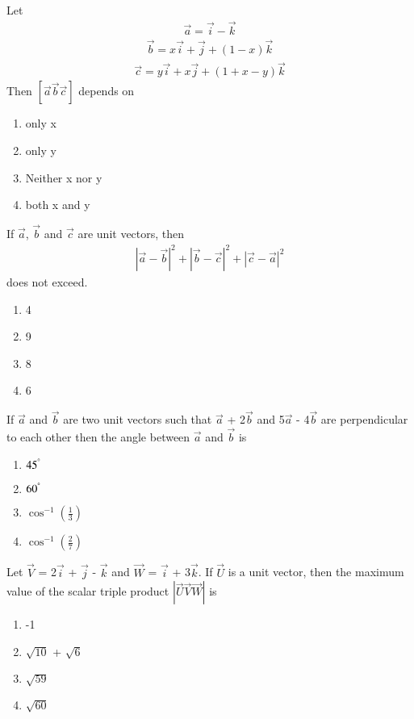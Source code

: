 \item Let 
\begin{align*}
\overrightarrow{a} = \overrightarrow{i} - \overrightarrow{k}
\end{align*}
\begin{align*}
\overrightarrow{b} = x\overrightarrow{i} + \overrightarrow{j} + (1 - x)\overrightarrow{k}
\end{align*}
\begin{align*}
\overrightarrow{c} = y\overrightarrow{i} + x\overrightarrow{j} + (1 + x -y)\overrightarrow{k}
\end{align*}
Then $[\overrightarrow{a}\overrightarrow{b}\overrightarrow{c}]$ depends on
\begin{enumerate}
\item only x
\item only y
\item Neither x nor y
\item both x and y
\end{enumerate}

\item If $\overrightarrow{a}$, $\overrightarrow{b}$ and $\overrightarrow{c}$ are unit vectors, then 
\begin{align*}
|\overrightarrow{a} - \overrightarrow{b}|^{2} + |\overrightarrow{b} - \overrightarrow{c}|^{2} + |\overrightarrow{c} - \overrightarrow{a}|^{2}
\end{align*}
does not exceed.
\begin{enumerate}
\item 4
\item 9
\item 8
\item 6
\end{enumerate}

\item If $\overrightarrow{a}$ and $\overrightarrow{b}$ are two unit vectors such that $\overrightarrow{a}$ + 2$\overrightarrow{b}$ and 5$\overrightarrow{a}$ - 4$\overrightarrow{b}$ are perpendicular to each other then the angle between $\overrightarrow{a}$ and $\overrightarrow{b}$ is
\begin{enumerate}
\item $45^{\degree}$
\item $60^{\degree}$
\item $\cos^{-1}(\frac{1}{3})$
\item $\cos^{-1}(\frac{2}{7})$
\end{enumerate}

\item Let $\overrightarrow{V}$ = 2$\overrightarrow{i}$ + $\overrightarrow{j}$ - $\overrightarrow{k}$ and $\overrightarrow{W}$ = $\overrightarrow{i}$ + 3$\overrightarrow{k}$. If $\overrightarrow{U}$ is a unit vector, then the maximum value of the scalar triple product $|\overrightarrow{U}\overrightarrow{V}\overrightarrow{W}|$
is
\begin{enumerate}
\item -1
\item $\sqrt{10}$ + $\sqrt{6}$
\item $\sqrt{59}$
\item $\sqrt{60}$ 
\end{enumerate}

